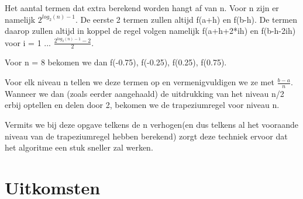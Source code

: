 \documentclass{article}
\begin{document}
\begin{flushleft}
Het aantal termen dat extra berekend worden hangt af van n. Voor n zijn er namelijk $ 2^{log_{2}(n)-1}$. De eerste 2 termen zullen altijd f(a+h) en f(b-h). De termen daarop zullen altijd in koppel de regel volgen namelijk f(a+h+2*ih) en f(b-h-2ih) voor i = 1 ... $  \frac{2^{log_{2}(n)-1}-2}{2}$.
\newline

Voor n = 8 bekomen we dan f(-0.75), f(-0.25), f(0.25), f(0.75).
\newline

Voor elk niveau n tellen we deze termen op en vermenigvuldigen we ze met $\frac{b-a}{n}$. Wanneer we dan (zoals eerder aangehaald) de uitdrukking van het niveau n/2 erbij optellen en delen door 2, bekomen we de trapeziumregel voor niveau n.
\newline

Vermits we bij deze opgave telkens de n verhogen(en dus telkens al het vooraande niveau van de trapeziumregel hebben berekend) zorgt deze techniek ervoor dat het algoritme een stuk sneller zal werken.
\section{Uitkomsten}


\end{flushleft}
\end{document}

